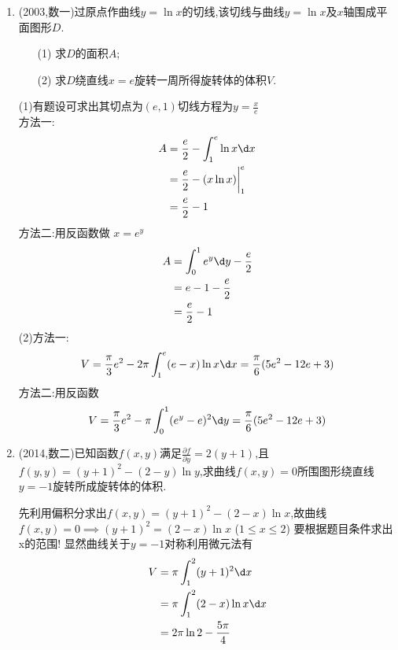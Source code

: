 \documentclass[12pt, a4paper, oneside, UTF8]{ctexbook}
\begin{document}
\begin{enumerate}[label=\arabic*.,start=16]
    \item (2003,数一)过原点作曲线$y=\ln x$的切线,该切线与曲线$y=\ln x$及$x$轴围成平面图形$D$.
    \begin{enumerate}[label=(\roman*)]
        \item[(1)] 求$D$的面积$A$;
        \item[(2)] 求$D$绕直线$x=e$旋转一周所得旋转体的体积$V$.
    \end{enumerate}
    
    \begin{solution}
    (1)有题设可求出其切点为$(e,1)$切线方程为$y=\frac{x}{e}$ \\
    方法一:
    \begin{align*}
        A &=\frac{e}{2}-\int_{1}^{e}\ln{x}\d x \\
        &=\frac{e}{2}-(x\ln{x})\bigg|^{e}_1 \\
        &=\frac{e}{2}-1
    \end{align*}
    方法二:用反函数做 $x=e^{y}$
    \begin{align*}
        A &=\int_{0}^{1}e^{y}\d y - \frac{e}{2} \\
        &= e - 1 -\frac{e}{2} \\
        &=\frac{e}{2} - 1
    \end{align*}
    (2)方法一:
    \begin{align*}
        V=\frac{\pi}{3}e^2-2\pi\int_{1}^{e}(e-x)\ln{x}\d x = \frac{\pi}{6}(5e^2-12e+3)
    \end{align*}
    方法二:用反函数
    \begin{align*}
        V=\frac{\pi}{3}e^2-\pi\int_{0}^{1}(e^{y}-e)^2\d y = \frac{\pi}{6}(5e^2-12e+3)
    \end{align*}
    \end{solution}
    
    \item (2014,数二)已知函数$f(x, y)$满足$\frac{\partial f}{\partial y}=2(y+1)$,且$f(y, y)=(y+1)^2-(2-y)\ln y$,求曲线$f(x, y)=0$所围图形绕直线$y=-1$旋转所成旋转体的体积.
    
    \begin{solution}
    先利用偏积分求出$f(x,y)=(y+1)^2-(2-x)\ln{x}$,故曲线$f(x,y)=0\implies (y+1)^2=(2-x)\ln{x}$ {\color{red} ($1\leq x\leq 2$)} 要根据题目条件求出
    x的范围! 显然曲线关于$y=-1$对称利用微元法有
    \begin{align*}
        V &=\pi\int_{1}^{2}(y+1)^2\d x \\
        &=\pi\int_{1}^{2}(2-x)\ln{x}\d x \\
        &=2\pi\ln{2}-\frac{5\pi}{4}
    \end{align*}
    \end{solution}
\end{enumerate}
\end{document}
